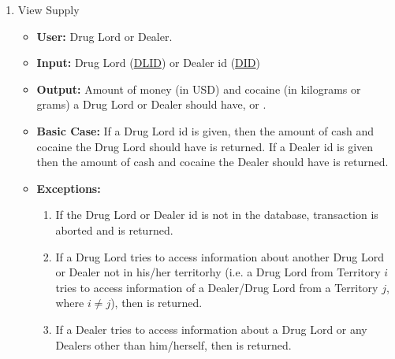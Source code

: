 \documentclass[11pt, oneside]{article}   	%
\theoremstyle{definition}
\theoremstyle{remark}
\begin{document}
\begin{enumerate}
		
	\item View Supply
	\begin{itemize}
		\item \textbf{User:} Drug Lord or Dealer.
		\item \textbf{Input:} Drug Lord (\underline{DLID}) or Dealer id (\underline{DID})
		\item \textbf{Output:} Amount of money (in USD) and cocaine (in kilograms or grams) a Drug Lord or Dealer should have,  or .
		\item \textbf{Basic Case:} If a Drug Lord id is given, then the amount of cash and cocaine the Drug Lord should have is returned. If a Dealer id is given then the amount of cash and cocaine the Dealer should have is returned.
		\item \textbf{Exceptions:}
		\begin{enumerate}
			\item If the Drug Lord or Dealer id is not in the database, transaction is aborted and  is returned.
			\item If a Drug Lord tries to access information about another Drug Lord or Dealer not in his/her territorhy (i.e. a Drug Lord from Territory $i$ tries to access information of a Dealer/Drug Lord from a Territory $j$, where $i\neq j$), then  is returned.	
			\item If a Dealer tries to access information about a Drug Lord or any Dealers other than him/herself, then  is returned.	
		\end{enumerate}
	\end{itemize}		
			

\end{enumerate}
\end{document}

